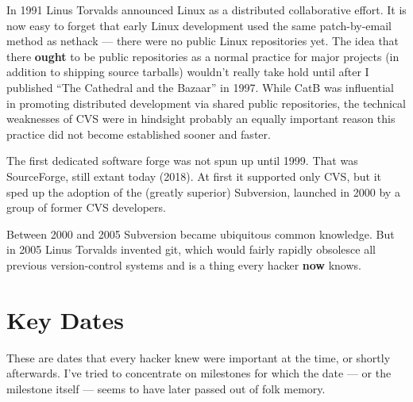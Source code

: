 \documentclass[12pt,letterpaper]{article}
\newcommand{\strong}[1]{\textbf{#1}}
\newcommand{\mc}{\small}
\newcommand{\acro}[1]{{\mc #1\spacefactor1000}}
\begin{document}
In 1991 Linus Torvalds announced Linux as a distributed collaborative effort.
It is now easy to forget that early Linux development used the same
patch-by-email method as nethack --- there were no public Linux repositories yet.
The idea that there \strong{ought} to be public repositories as a normal practice for
major projects (in addition to shipping source tarballs) wouldn't really take
hold until after I published ``The Cathedral and the Bazaar'' in 1997. While CatB
was influential in promoting distributed development via shared public
repositories, the technical weaknesses of \acro{CVS} were in hindsight probably an
equally important reason this practice did not become established sooner and
faster.

The first dedicated software forge was not spun up until 1999. That was
SourceForge, still extant today (2018). At first it supported only \acro{CVS}, but it
sped up the adoption of the (greatly superior) Subversion, launched in 2000 by
a group of former \acro{CVS} developers.

Between 2000 and 2005 Subversion became ubiquitous common knowledge. But in
2005 Linus Torvalds invented git, which would fairly rapidly obsolesce all
previous version-control systems and is a thing every hacker \strong{now} knows.

\section{Key Dates}
These are dates that every hacker knew were important at the time, or shortly
afterwards. I've tried to concentrate on milestones for which the date --- or the
milestone itself --- seems to have later passed out of folk memory.
\end{document}
